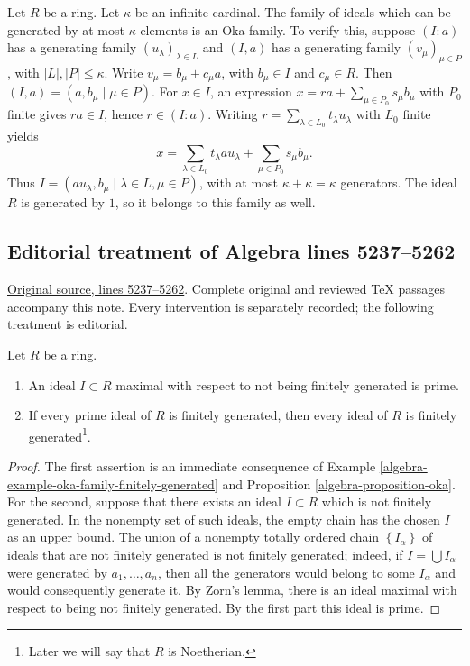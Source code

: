 \begin{example}
\label{editorial-source-example-oka-family-bound-cardinality}
Let $R$ be a ring.
Let $\kappa$ be an infinite cardinal.
The family of ideals which can be generated by at most $\kappa$ elements
is an Oka family. To verify this, suppose $(I:a)$ has a
generating family $(u_\lambda)_{\lambda\in L}$ and $(I,a)$ has
a generating family $(v_\mu)_{\mu\in P}$, with $|L|,|P|\leq\kappa$.
Write $v_\mu=b_\mu+c_\mu a$, with $b_\mu\in I$ and $c_\mu\in R$.
Then $(I,a)=(a,b_\mu\mid\mu\in P)$.
For $x\in I$, an expression
$x=ra+\sum_{\mu\in P_0}s_\mu b_\mu$ with $P_0$ finite gives
$ra\in I$, hence $r\in(I:a)$. Writing
$r=\sum_{\lambda\in L_0}t_\lambda u_\lambda$ with $L_0$ finite yields
$$
x=\sum_{\lambda\in L_0}t_\lambda a u_\lambda+
\sum_{\mu\in P_0}s_\mu b_\mu.
$$
Thus $I=(a u_\lambda,b_\mu\mid\lambda\in L,\mu\in P)$, with
at most $\kappa+\kappa=\kappa$ generators. The ideal $R$ is
generated by $1$, so it belongs to this family as well.
\end{example}


\subsection{Editorial treatment of Algebra lines 5237--5262}

\hypertarget{algebra-context-029}{}

\noindent\href{https://github.com/stacks/stacks-project/blob/a04446e57ec1fbc252a871afcec7752fb2807b14/algebra.tex\#L5237}{Original source, lines 5237--5262}. Complete original and reviewed TeX passages accompany this note. Every intervention is separately recorded; the following treatment is editorial.


\begin{lemma}
\label{editorial-source-lemma-cohen}
Let $R$ be a ring.
\begin{enumerate}
\item An ideal $I \subset R$ maximal with respect to not being
finitely generated is prime.
\item If every prime ideal of $R$ is
finitely generated, then
every ideal of $R$ is finitely generated\footnote{Later we will say
that $R$ is Noetherian.}.
\end{enumerate}
\end{lemma}

\begin{proof}
The first assertion is an immediate consequence of
Example \ref{algebra-example-oka-family-finitely-generated} and
Proposition \ref{algebra-proposition-oka}. For the second,
suppose that there exists an ideal $I \subset R$ which is not finitely
generated. In the nonempty set of such ideals, the empty chain
has the chosen $I$ as an upper bound. The union of a nonempty totally ordered chain $\left\{I_\alpha\right\}$
of ideals that are not finitely generated is not finitely generated;
indeed, if $I = \bigcup I_\alpha$ were generated by
$a_1, \ldots, a_n$, then all the generators would belong to some
$I_\alpha $ and would consequently generate it.
By Zorn's lemma, there is an ideal maximal with respect to being not finitely
generated. By the first part this ideal is prime.
\end{proof}


